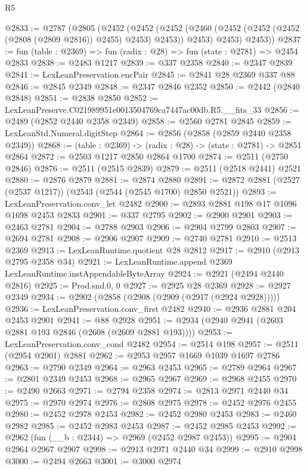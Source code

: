 \begin{lexlean}{R5}
\begin{coremodule}
@2833 := @2787
    (@2805
      (@2452
        (@2452
          (@2452 (@2460 (@2452 (@2452 (@2452 (@2808 (@2809 @2816)) @2455) @2453) @2453)) @2453)
          @2453)
        @2453))
@2837 := fun (table : @2369) => fun (radix : @28) => fun (state : @2781) => @2454 @2833
@2838 := @2483 @1217
@2839 := @337 @2358
@2840 := @2347 @2839
@2841 := LexLeanPreservation.encPair
@2845 := @2841 @28 @2369 @337 @88
@2846 := @2845 @2349
@2848 := @2347 @2846 @2352
@2850 := @2442 (@2840 @2848)
@2851 := @2838 @2850
@2852 := LexLeanPreserve.C021989951e0013504769ca7447ac00db.R5.__fits_33
@2856 := @2489 (@2852 @2440 @2358 @2349)
@2858 := @2560 @2781 @2845
@2859 := LexLeanStd.Numeral.digitStep
@2864 := @2856 (@2858 (@2859 @2440 @2358 @2349))
@2868 := (table : @2369) -> (radix : @28) -> (state : @2781) -> @2851 @2864
@2872 := @2503 @1217 @2850 @2864 @1700
@2874 := @2511 (@2750 @2846)
@2876 := @2511 (@2515 @2839)
@2879 := @2511 (@2518 @2441) @2521
@2880 := @2876 @2879
@2881 := @2874 @2880
@2891 := @2872 @2881 (@2527 (@2537 @1217)) (@2543 (@2544 (@2545 @1700) @2850 @2521))
@2893 := LexLeanPreservation.conv_let @2482
@2900 := @2893 @2881 @198 @17 @1096 @1698 @2453 @2833
@2901 := @337 @2795
@2902 := @2900 @2901
@2903 := @2463 @2781
@2904 := @2788 @2903
@2906 := @2904 @2799 @2803
@2907 := @2694 @2781
@2908 := @2906 @2907
@2909 := @2740 @2781
@2910 := @2513 @2369
@2913 := LexLeanRuntime.quotient @28 @2812
@2917 := @2910 (@2913 @2795 @2358 @34)
@2921 := LexLeanRuntime.append @2369 LexLeanRuntime.instAppendableByteArray
@2924 := @2921 (@2494 @2440 @2816)
@2925 := Prod.snd.{0, 0}
@2927 := @2925 @28 @2369
@2928 := @2927 @2349
@2934 := @2902 (@2858 (@2908 (@2909 (@2917 (@2924 @2928)))))
@2936 := LexLeanPreservation.conv_first @2482
@2940 := @2936 @2881 @204 @2453 @2901
@2941 := @88 @2928
@2951 := @2934 (@2940 @2941 (@2603 @2881 @193 @2846 (@2608 (@2609 @2881 @193))))
@2953 := LexLeanPreservation.conv_cond @2482
@2954 := @2514 @198
@2957 := @2511 (@2954 @2901) @2881
@2962 := @2953 @2957 @1669 @1039 @1697 @2786
@2963 := @2790 @2349
@2964 := @2963 @2453
@2965 := @2789 @2964
@2967 := @2801 @2349 @2453
@2968 := @2965 @2967
@2969 := @2968 @2455
@2970 := @2490 @2663
@2971 := @2794 @2358
@2974 := @2813 @2971 @2440 @34
@2975 := @2970 @2974
@2976 := @2808 @2975
@2978 := @2452 @2976 @2455
@2980 := @2452 @2978 @2453
@2982 := @2452 @2980 @2453
@2983 := @2460 @2982
@2985 := @2452 @2983 @2453
@2987 := @2452 @2985 @2453
@2992 := @2962 (fun (__b : @2344) => @2969 (@2452 @2987 @2453))
@2995 := @2904 @2964 @2967 @2907
@2998 := @2913 @2971 @2440 @34
@2999 := @2910 @2998
@3000 := @2494 @2663
@3001 := @3000 @2974

\end{coremodule}
\end{lexlean}

